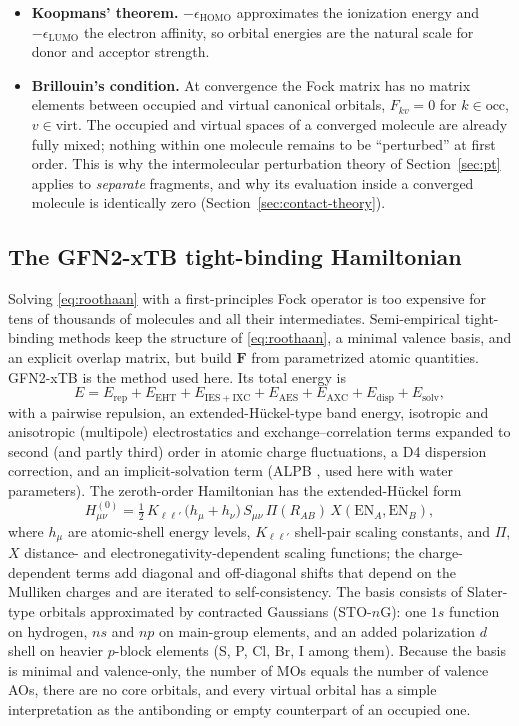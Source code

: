 \documentclass[11pt,a4paper]{article}
\newcommand{\occ}{\mathrm{occ}}
\newcommand{\virt}{\mathrm{virt}}
\newcommand{\vb}[1]{\bm{#1}}
\begin{document}
\begin{itemize}[nosep]
\item \textbf{Koopmans' theorem.} $-\epsilon_{\mathrm{HOMO}}$ approximates the ionization energy and $-\epsilon_{\mathrm{LUMO}}$ the electron affinity, so orbital energies are the natural scale for donor and acceptor strength.
\item \textbf{Brillouin's condition.} At convergence the Fock matrix has no matrix elements between occupied and virtual canonical orbitals, $F_{kv}=0$ for $k\in\occ$, $v\in\virt$. The occupied and virtual spaces of a converged molecule are already fully mixed; nothing within one molecule remains to be ``perturbed'' at first order. This is why the intermolecular perturbation theory of Section~\ref{sec:pt} applies to \emph{separate} fragments, and why its evaluation inside a converged molecule is identically zero (Section~\ref{sec:contact-theory}).
\end{itemize}

\subsection{The GFN2-xTB tight-binding Hamiltonian}
Solving \eqref{eq:roothaan} with a first-principles Fock operator is too expensive for tens of thousands of molecules and all their intermediates. Semi-empirical tight-binding methods keep the structure of \eqref{eq:roothaan}, a minimal valence basis, and an explicit overlap matrix, but build $\vb{F}$ from parametrized atomic quantities. GFN2-xTB \cite{gfn2} is the method used here. Its total energy is
\begin{equation}
E=E_{\mathrm{rep}}+E_{\mathrm{EHT}}+E_{\mathrm{IES+IXC}}+E_{\mathrm{AES}}+E_{\mathrm{AXC}}+E_{\mathrm{disp}}+E_{\mathrm{solv}},
\end{equation}
with a pairwise repulsion, an extended-H\"uckel-type band energy, isotropic and anisotropic (multipole) electrostatics and exchange--correlation terms expanded to second (and partly third) order in atomic charge fluctuations, a D4 dispersion correction, and an implicit-solvation term (ALPB \cite{alpb}, used here with water parameters). The zeroth-order Hamiltonian has the extended-H\"uckel form
\begin{equation}
H^{(0)}_{\mu\nu}=\tfrac12\,K_{\ell\ell'}\,\big(h_\mu+h_\nu\big)\,S_{\mu\nu}\,\Pi(R_{AB})\,X(\mathrm{EN}_A,\mathrm{EN}_B),
\label{eq:eht}
\end{equation}
where $h_\mu$ are atomic-shell energy levels, $K_{\ell\ell'}$ shell-pair scaling constants, and $\Pi$, $X$ distance- and electronegativity-dependent scaling functions; the charge-dependent terms add diagonal and off-diagonal shifts that depend on the Mulliken charges and are iterated to self-consistency. The basis consists of Slater-type orbitals approximated by contracted Gaussians (STO-$n$G): one $1s$ function on hydrogen, $ns$ and $np$ on main-group elements, and an added polarization $d$ shell on heavier $p$-block elements (S, P, Cl, Br, I among them). Because the basis is minimal and valence-only, the number of MOs equals the number of valence AOs, there are no core orbitals, and every virtual orbital has a simple interpretation as the antibonding or empty counterpart of an occupied one.
\end{document}
